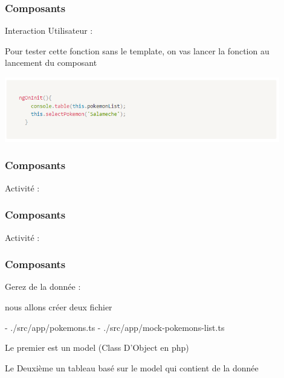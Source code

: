 \documentclass[10pt]{beamer}
\begin{document}
	\begin{frame}
		\frametitle{Composants}

		Interaction Utilisateur : \newline \newline

		Pour tester cette fonction sans le template, on vas lancer la fonction au lancement du composant

		\centering
		\includegraphics[width=12cm]{assets/userInt2} \newline


	\end{frame}

	\begin{frame}
		\frametitle{Composants}

		Activité : \newline \newline


	\end{frame}

	\begin{frame}
		\frametitle{Composants}

		Activité : \newline \newline


	\end{frame}

	\begin{frame}
		\frametitle{Composants}

		Gerez de la donnée : \newline \newline

		nous allons créer deux fichier \newline \newline

		- ./src/app/pokemons.ts \newline
		- ./src/app/mock-pokemons-list.ts \newline \newline

		Le premier est un model (Class D'Object en php) \newline \newline

		Le Deuxième un tableau basé sur le model qui contient de la donnée

	\end{frame}
\end{document}
